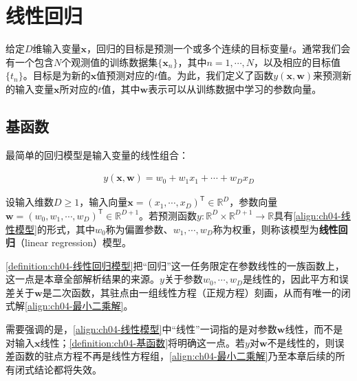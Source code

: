 \documentclass[../../main.tex]{subfiles}
\begin{document}
\section{线性回归}\label{section:ch04-线性回归}

给定$D$维输入变量$\boldsymbol{x}$，回归的目标是预测一个或多个连续的目标变量$t$。通常我们会有一个包含$N$个观测值的训练数据集$\{\boldsymbol{x}_n\}$，其中$n=1,\cdots,N$，以及相应的目标值$\{t_n\}$。目标是为新的$\boldsymbol{x}$值预测对应的$t$值。为此，我们定义了函数$y(\boldsymbol{x},\boldsymbol{w})$来预测新的输入变量$\boldsymbol{x}$所对应的$t$值，其中$\boldsymbol{w}$表示可以从训练数据中学习的参数向量。

\subsection{基函数}\label{subsection:ch04-基函数}

最简单的回归模型是输入变量的线性组合：

\begin{align}
  y(\boldsymbol{x},\boldsymbol{w})=w_0+w_1x_1+\cdots+w_Dx_D
  \label{align:ch04-线性模型}
\end{align}

\begin{definition}[线性回归模型]\label{definition:ch04-线性回归模型}
设输入维数$D\geqslant1$，输入向量$\boldsymbol{x}=(x_1,\cdots,x_D)^{\mathsf{T}}\in\mathbb{R}^{D}$，参数向量$\boldsymbol{w}=(w_0,w_1,\cdots,w_D)^{\mathsf{T}}\in\mathbb{R}^{D+1}$。若预测函数$y:\mathbb{R}^{D}\times\mathbb{R}^{D+1}\to\mathbb{R}$具有\eqref{align:ch04-线性模型}的形式，其中$w_0$称为偏置参数、$w_1,\cdots,w_D$称为权重，则称该模型为\textbf{线性回归}（linear regression）模型。
\end{definition}

\begin{remark}
\cref{definition:ch04-线性回归模型}把“回归”这一任务限定在参数线性的一族函数上，这一点是本章全部解析结果的来源。$y$关于参数$w_0,\cdots,w_D$是线性的，因此平方和误差关于$\boldsymbol{w}$是二次函数，其驻点由一组线性方程（正规方程）刻画，从而有唯一的闭式解\eqref{align:ch04-最小二乘解}。

需要强调的是，\eqref{align:ch04-线性模型}中“线性”一词指的是对参数$\boldsymbol{w}$线性，而不是对输入$\boldsymbol{x}$线性；\cref{definition:ch04-基函数}将明确这一点。若$y$对$\boldsymbol{w}$不是线性的，则误差函数的驻点方程不再是线性方程组，\eqref{align:ch04-最小二乘解}乃至本章后续的所有闭式结论都将失效。
\end{remark}
\end{document}
